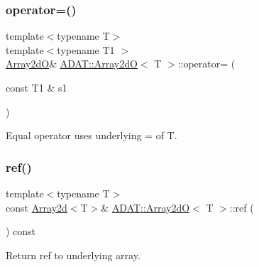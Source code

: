 \mbox{\label{classADAT_1_1Array2dO_a82bf731b5d6edfc53b941b5815647a6e}} 
\subsubsection{\texorpdfstring{operator=()}{operator=()}\hspace{0.1cm}{\footnotesize\ttfamily [6/6]}}
{\footnotesize\ttfamily template$<$typename T$>$ \\
template$<$typename T1 $>$ \\
\mbox{\hyperlink{classADAT_1_1Array2dO}{Array2dO}}\& \mbox{\hyperlink{classADAT_1_1Array2dO}{A\+D\+A\+T\+::\+Array2dO}}$<$ T $>$\+::operator= (\begin{DoxyParamCaption}\item[{const T1 \&}]{s1 }\end{DoxyParamCaption})\hspace{0.3cm}{\ttfamily [inline]}}



Equal operator uses underlying = of T. 

\mbox{\label{classADAT_1_1Array2dO_a376d2e36985a9c05e09bd33244865997}} 
\subsubsection{\texorpdfstring{ref()}{ref()}\hspace{0.1cm}{\footnotesize\ttfamily [1/6]}}
{\footnotesize\ttfamily template$<$typename T$>$ \\
const \mbox{\hyperlink{classXMLArray_1_1Array2d}{Array2d}}$<$T$>$\& \mbox{\hyperlink{classADAT_1_1Array2dO}{A\+D\+A\+T\+::\+Array2dO}}$<$ T $>$\+::ref (\begin{DoxyParamCaption}{ }\end{DoxyParamCaption}) const\hspace{0.3cm}{\ttfamily [inline]}}



Return ref to underlying array. 

\mbox{\label{classADAT_1_1Array2dO_a376d2e36985a9c05e09bd33244865997}} 
